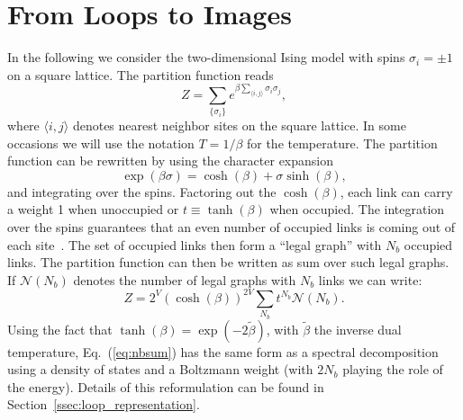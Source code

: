 \documentclass[../main.tex]{subfiles}
\begin{document}
\section{From Loops to Images}%
\label{configs_as_images}

In the following we consider the two-dimensional Ising model with spins
$\sigma_i = \pm 1$ on a square lattice.
%
The partition function reads
%
\begin{equation}
  Z = \sum_{\{\sigma_i\}} e^{\beta \sum_{\langle i, j \rangle} \sigma_i
    \sigma_j}
\label{ih}, 
\end{equation}
%
where $\langle i, j \rangle$ denotes nearest neighbor sites on the square
lattice.
%
In some occasions we will use the notation $T=1/\beta$ for the temperature.
%
The partition function can be rewritten by using the character
expansion~\cite{RevModPhys.52.453}%
%
\begin{equation}
\exp(\beta\sigma)=\cosh(\beta)+\sigma\sinh(\beta),
\end{equation}
%
and integrating over the spins.
%
Factoring out the $\cosh(\beta)$, each link can carry a weight 1 when
unoccupied or $t\equiv \tanh(\beta)$ when occupied.
%
The integration over the spins guarantees that an even number of occupied links
is coming out of each site~\cite{RevModPhys.52.453}.
%
The set of occupied links then form a ``legal graph'' with $N_b$ occupied
links.
%
The partition function can then be written as sum over such legal graphs. If
$\mathcal{N}(N_b)$ denotes the number of legal graphs with $N_b$ links we can
write: 
%
\begin{equation}
    Z=2^V{(\cosh(\beta))}^{2V}\sum_{N_b} t^{N_b}\mathcal{N}(N_b).
\label{eq:nbsum}
\end{equation}
%
Using the fact that $\tanh(\beta)=\exp(-2\tilde{\beta})$, with $\tilde{\beta}$
the inverse dual temperature, Eq.~(\ref{eq:nbsum}) has the same form as a
spectral decomposition using a density of states and a Boltzmann weight (with
$2N_b$ playing the role of the energy).
%
Details of this reformulation can be found in
Section~\ref{ssec:loop_representation}.
\end{document}
